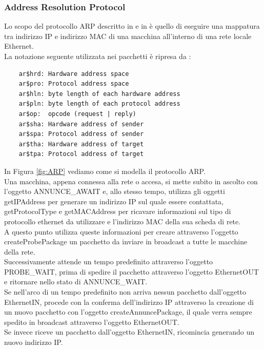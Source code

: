 \newpage
\subsubsection*{Address Resolution Protocol}
Lo scopo del protocollo ARP descritto in \cite{RFC0826} e in \cite{RFC5227} è quello di eseguire una mappatura tra indirizzo IP e indirizzo MAC di una macchina all'interno di una rete locale Ethernet.\\
La notazione seguente utilizzata nei pacchetti è ripresa da \cite{RFC0826}:
\begin{lstlisting}
    ar$hrd: Hardware address space 
    ar$pro: Protocol address space
    ar$hln: byte length of each hardware address
    ar$pln: byte length of each protocol address
    ar$op:  opcode (request | reply)
    ar$sha: Hardware address of sender 
    ar$spa: Protocol address of sender 
    ar$tha: Hardware address of target
    ar$tpa: Protocol address of target
\end{lstlisting}
In Figura \ref*{fig:ARP} vediamo come si modella il protocollo ARP.\\
Una macchina, appena connessa alla rete o accesa, si mette subito in ascolto con l'oggetto ANNUNCE\_AWAIT e, allo stesso tempo, utilizza gli oggetti getIPAddress per generare un indirizzo IP sul quale essere contattata, getProtocolType e getMACAddress  per ricavare informazioni sul tipo di protocollo ethernet da utilizzare e l'indirizzo MAC della sua scheda di rete.\\
A questo punto utilizza queste informazioni per creare attraverso l'oggetto createProbePackage un pacchetto da inviare in broadcast a tutte le macchine della rete.\\
Successivamente attende un tempo predefinito attraverso l'oggetto PROBE\_WAIT, prima di spedire il pacchetto attraverso l'oggetto EthernetOUT e ritornare nello stato di ANNUNCE\_WAIT.\\
Se nell'arco di un tempo predefinito non arriva nessun pacchetto dall'oggetto EthernetIN, procede con la conferma dell'indirizzo IP attraverso la creazione di un nuovo pacchetto con l'oggetto createAnnuncePackage, il quale verra sempre spedito in broadcast attraverso l'oggetto EthernetOUT.\\
Se invece riceve un pacchetto dall'oggetto EthernetIN, ricomincia generando un nuovo indirizzo IP.\\
\newpage

